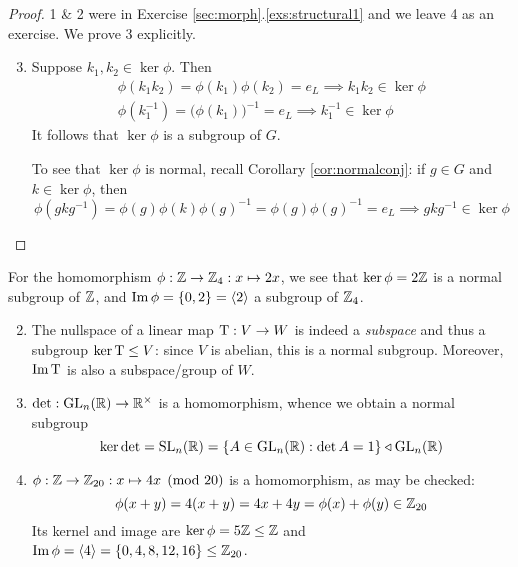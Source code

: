 \begin{proof}
	1 \& 2 were in Exercise \ref*{sec:morph}.\ref{exs:structural1} and we leave 4 as an exercise. We prove 3 explicitly.
	\begin{enumerate}\setcounter{enumi}{2}
	  \item Suppose $k_1,k_2\in\ker\phi$. Then
	  \begin{gather*}
		  \phi(k_1k_2)=\phi(k_1)\phi(k_2)=e_L\implies k_1k_2\in\ker\phi\\
		  \phi(k_1^{-1})=\bigl(\phi(k_1)\bigr)^{-1}=e_L\implies k_1^{-1}\in\ker\phi
	  \end{gather*}
	  It follows that $\ker\phi$ is a subgroup of $G$.\par
	  To see that $\ker\phi$ is normal, recall Corollary \ref{cor:normalconj}: if $g\in G$ and $k\in\ker\phi$, then
	  \[
	  	\phi(gk g^{-1})=\phi(g)\phi(k)\phi(g)^{-1}
	  	=\phi(g)\phi(g)^{-1}=e_L
	  	\implies gk g^{-1}\in\ker\phi
	  	\tag*{\qedhere}
	  \]
	\end{enumerate}
\end{proof}


\goodbreak


\begin{examples}{}{}
	\exstart For the homomorphism $\phi:\mathbb{Z}\to\mathbb{Z}_4:x\mapsto 2x$, we see that $\ker\phi=2\mathbb{Z}$ is a normal subgroup of $\mathbb{Z}$, and $\operatorname{Im}\phi=\{0,2\}=\left\langle 2\right\rangle$ a subgroup of $\mathbb{Z}_4$. 
	\begin{enumerate}\setcounter{enumi}{1}
	  \item The nullspace of a linear map $\mathrm{T}:V\to W$ is indeed a \emph{subspace} and thus a subgroup $\ker\mathrm{T}\le V$: since $V$ is abelian, this is a normal subgroup. Moreover, $\operatorname{Im}\mathrm{T}$ is also a subspace/group of $W$.
	  
		\item $\det:\mathrm{GL}_n(\mathbb{R})\to\mathbb{R}^\times$ is a homomorphism, whence we obtain a normal subgroup
		\[
			\ker\det=\mathrm{SL}_n(\mathbb{R})=\{A\in\mathrm{GL}_n(\mathbb{R}):\det A=1\}
			\triangleleft\mathrm{GL}_n(\mathbb{R})
		\]
		
		\item $\phi:\mathbb{Z}\to\mathbb{Z}_{20}:x\mapsto 4x\pmod{20}$ is a homomorphism, as may be checked:
		\[
			\phi(x+y)=4(x+y)=4x+4y
			=\phi(x)+\phi(y)\in\mathbb{Z}_{20}
		\]
		Its kernel and image are $\ker\phi=5\mathbb{Z}\le\mathbb{Z}$ and $\operatorname{Im}\phi=\left\langle 4\right\rangle=\{0,4,8,12,16\}\le\mathbb{Z}_{20}$.
	\end{enumerate}
\end{examples}

